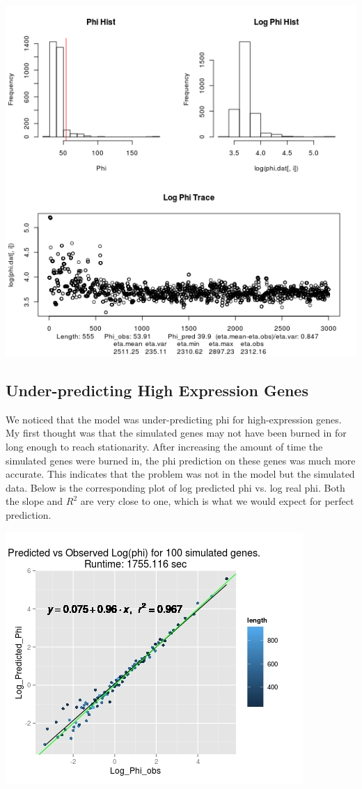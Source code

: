 \documentclass{article}
\begin{document}
 	\includegraphics[scale=0.5]{../chosen_100/3000_steps/BIS10/reflnorm_prop/hist/43_phi_hist.png}
 	
 	\subsection{Under-predicting High Expression Genes}
	 	
	 	We noticed that the model was under-predicting phi for high-expression genes. My first thought was that the simulated genes may not have been burned in for long enough to reach stationarity. After increasing the amount of time the simulated genes were burned in, the phi prediction on these genes was much more accurate. This indicates that the problem was not in the model but the simulated data. Below is the corresponding plot of log predicted phi vs. log real phi. Both the slope and $R^2$ are very close to one, which is what we would expect for perfect prediction. 
	 	
	 \includegraphics[scale=0.5]{../chosen_100/3000_steps/BIS10/reflnorm_prop/norand/Rplot.jpeg}
 		
\end{document}
